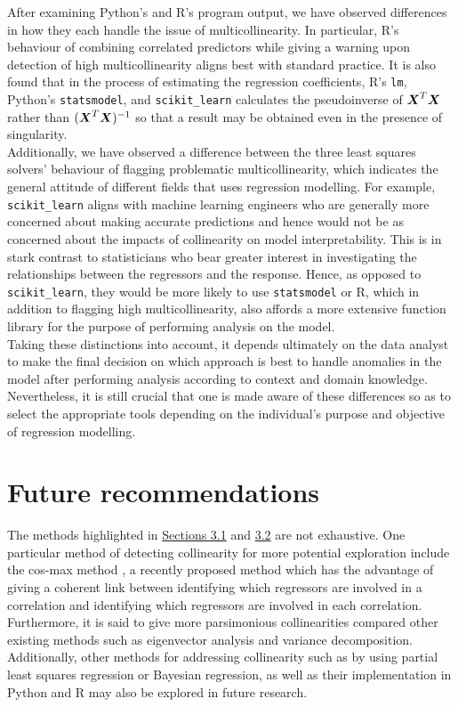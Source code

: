 \documentclass[12pt]{article}
\begin{document}
	After examining Python's and R's program output, we have observed differences in how they each handle the issue of multicollinearity. In particular, R's behaviour of combining correlated predictors while giving a warning upon detection of high multicollinearity aligns best with standard practice. It is also found that in the process of estimating the regression coefficients, R's \texttt{lm}, Python's \texttt{statsmodel}, and \texttt{scikit\_learn} calculates the pseudoinverse of $\boldsymbol{X}^T\boldsymbol{X}$ rather than $(\boldsymbol{X}^T\boldsymbol{X})^{-1}$ so that a result may be obtained even in the presence of singularity.\\
	
	Additionally, we have observed a difference between the three least squares solvers' behaviour of flagging problematic multicollinearity, which indicates the general attitude of different fields that uses regression modelling. For example, \texttt{scikit\_learn} aligns with machine learning engineers who are generally more concerned about making accurate predictions and hence would not be as concerned about the impacts of collinearity on model interpretability. This is in stark contrast to statisticians who bear greater interest in investigating the relationships between the regressors and the response. Hence, as opposed to \texttt{scikit\_learn}, they would be more likely to use \texttt{statsmodel} or R, which in addition to flagging high multicollinearity, also affords a more extensive function library for the purpose of performing analysis on the model.\\
	
	Taking these distinctions into account, it depends ultimately on the data analyst to make the final decision on which approach is best to handle anomalies in the model after performing analysis according to context and domain knowledge. Nevertheless, it is still crucial that one is made aware of these differences so as to select the appropriate tools depending on the individual's purpose and objective of regression modelling. 
	
	\section{Future recommendations\label{sec:future-rec}}
	
	The methods highlighted in \hyperref[sec:3.1]{Sections 3.1} and \hyperref[sec:3.2]{3.2} are not exhaustive. One particular method of detecting collinearity for more potential exploration include the cos-max method \cite{Shabuz2024}, a recently proposed method which has the advantage of giving a coherent link between identifying which regressors are involved in a correlation and identifying which regressors are involved in each correlation. Furthermore, it is said to give more parsimonious collinearities compared other existing methods such as eigenvector analysis and variance decomposition. Additionally, other methods for addressing collinearity such as by using partial least squares regression or Bayesian regression, as well as their implementation in Python and R may also be explored in future research. \\
	
\end{document}
